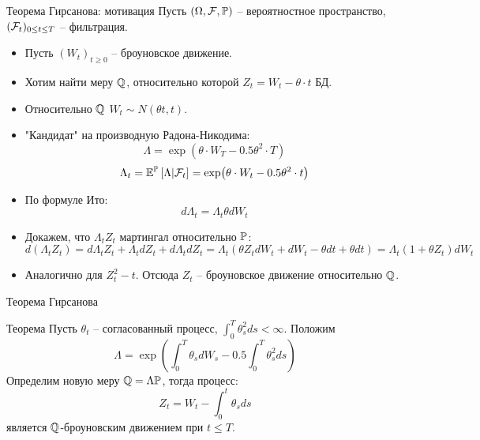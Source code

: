 \documentclass[aspectratio=169]{beamer}
\begin{document}
\begin{frame}{Теорема Гирсанова: мотивация}
    Пусть $(\Omega, \mathcal{F}, \mathbb{P})$ -- вероятностное пространство, $(\mathcal{F}_t)_{0 \leq t \leq T}$ -- фильтрация.
    \begin{itemize}
        \item Пусть $(W_t)_{t\geq 0}$ -- броуновское движение. 
        \item Хотим найти меру $\mathbb{Q}$, относительно которой $Z_t = W_t - \theta \cdot t$ БД.
        \item Относительно $\mathbb{Q}$ $W_t \sim N(\theta t, t)$.
        \item "Кандидат" на производную Радона-Никодима:
        $$
            \Lambda = \exp(\theta \cdot W_T - 0.5 \theta^2 \cdot T)
        $$
        $$
            \Lambda_t = \mathbb{E}^{\mathbb{P}} \left[ \Lambda | \mathcal{F}_t \right] = \exp(\theta \cdot W_t - 0.5 \theta^2 \cdot t)
        $$
\pause
        \item По формуле Ито:
        $$
            d\Lambda_t = \Lambda_t \theta dW_t
        $$
        \item Докажем, что $\Lambda_t Z_t$ мартингал относительно $\mathbb{P}$:
        $$
            d(\Lambda_t Z_t) = 
            d\Lambda_t Z_t + \Lambda_t dZ_t + d\Lambda_t dZ_t
            = \Lambda_t \left( \theta Z_t dW_t + dW_t - \theta dt + \theta dt \right) =  
            \Lambda_t (1 + \theta Z_t ) dW_t
        $$
        \item Аналогично для $Z_t^2 - t$. Отсюда $Z_t$ -- броуновское движение относительно $\mathbb{Q}$.
    \end{itemize}
\end{frame}

\begin{frame}{Теорема Гирсанова}
    \begin{block}{Теорема}
        Пусть $\theta_t$ -- согласованный процесс, $\int_0^T \theta_s^2 ds < \infty$. Положим
        $$
            \Lambda = \exp(\int_0^T \theta_s dW_s - 0.5 \int_0^T \theta_s^2 ds)
        $$Определим новую меру $\mathbb{Q} = \Lambda \mathbb{P}$, тогда процесс:
        $$
            Z_t = W_t - \int_0^t \theta_s ds
        $$является $\mathbb{Q}$-броуновским движением при $t \leq T$.
    \end{block}
\end{frame}
\end{document}
